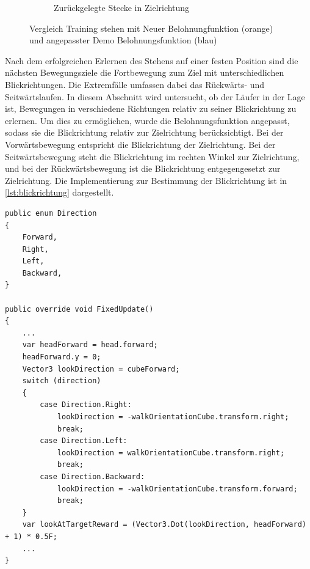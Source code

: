\begin{figure}[H]
\begin{subfigure}{.49\textwidth}
      \caption{Zurückgelegte Stecke in Zielrichtung}
      \label{fig:126_128_move_target_dir}
    \end{subfigure}
  \caption{Vergleich Training stehen mit Neuer Belohnungfunktion (orange) und angepasster Demo Belohnungsfunktion (blau)}
  \label{fig:vergleich_126_128}
\end{figure}

Nach dem erfolgreichen Erlernen des Stehens auf einer festen Position sind die nächsten Bewegungsziele die Fortbewegung zum Ziel mit unterschiedlichen Blickrichtungen. Die Extremfälle umfassen dabei das Rückwärts- und Seitwärtslaufen. In diesem Abschnitt wird untersucht, ob der Läufer in der Lage ist, Bewegungen in verschiedene Richtungen relativ zu seiner Blickrichtung zu erlernen. Um dies zu ermöglichen, wurde die Belohnungsfunktion angepasst, sodass sie die Blickrichtung relativ zur Zielrichtung berücksichtigt. Bei der Vorwärtsbewegung entspricht die Blickrichtung der Zielrichtung. Bei der Seitwärtsbewegung steht die Blickrichtung im rechten Winkel zur Zielrichtung, und bei der Rückwärtsbewegung ist die Blickrichtung entgegengesetzt zur Zielrichtung. Die Implementierung zur Bestimmung der Blickrichtung ist in \ref{lst:blickrichtung} dargestellt.

\begin{lstlisting}[caption={Blickrichtung festlegen mit Richtungs-Enum},captionpos=b,label={lst:blickrichtung}]
public enum Direction
{
    Forward,
    Right,
    Left,
    Backward,
}
    
public override void FixedUpdate()
{
    ...
    var headForward = head.forward;
    headForward.y = 0;
    Vector3 lookDirection = cubeForward;
    switch (direction)
    {
        case Direction.Right:
            lookDirection = -walkOrientationCube.transform.right;
            break;
        case Direction.Left:
            lookDirection = walkOrientationCube.transform.right;
            break;
        case Direction.Backward:
            lookDirection = -walkOrientationCube.transform.forward;
            break;
    }
    var lookAtTargetReward = (Vector3.Dot(lookDirection, headForward) + 1) * 0.5F;
    ...
}
\end{lstlisting}

